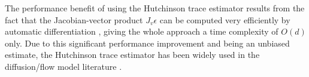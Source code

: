 The performance benefit of using the Hutchinson trace estimator results from the fact that the Jacobian-vector product $J_v \epsilon$ can be computed very efficiently by automatic differentiation \citep{baydinAutomaticDifferentiationMachine2018}, giving the whole approach a time complexity of $O(d)$ only. Due to this significant performance improvement and being an unbiased estimate, the Hutchinson trace estimator has been widely used in the diffusion/flow model literature \citep{lipmanFlowMatchingGenerative2023,songScoreBasedGenerativeModeling2021a}.


